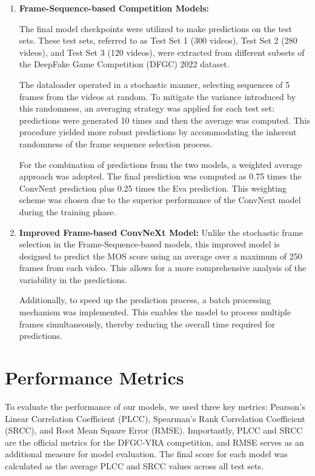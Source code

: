 \documentclass[a4paper,12pt,openright]{book}
\begin{document}
\begin{enumerate}
    \item \textbf{Frame-Sequence-based Competition Models:} 

The final model checkpoints were utilized to make predictions on the test sets. These test sets, referred to as Test Set 1 (300 videos), Test Set 2 (280 videos), and Test Set 3 (120 videos), were extracted from different subsets of the DeepFake Game Competition (DFGC) 2022 dataset.

The dataloader operated in a stochastic manner, selecting sequences of 5 frames from the videos at random. To mitigate the variance introduced by this randomness, an averaging strategy was applied for each test set: predictions were generated 10 times and then the average was computed. This procedure yielded more robust predictions by accommodating the inherent randomness of the frame sequence selection process.

For the combination of predictions from the two models, a weighted average approach was adopted. The final prediction was computed as 0.75 times the ConvNext prediction plus 0.25 times the Eva prediction. This weighting scheme was chosen due to the superior performance of the ConvNext model during the training phase.

\item \textbf{Improved Frame-based ConvNeXt Model:}
Unlike the stochastic frame selection in the Frame-Sequence-based models, this improved model is designed to predict the MOS score using an average over a maximum of 250 frames from each video. This allows for a more comprehensive analysis of the variability in the predictions. 

Additionally, to speed up the prediction process, a batch processing mechanism was implemented. This enables the model to process multiple frames simultaneously, thereby reducing the overall time required for predictions. 
\end{enumerate}

\section{Performance Metrics}
To evaluate the performance of our models, we used three key metrics: Pearson's Linear Correlation Coefficient (PLCC), Spearman's Rank Correlation Coefficient (SRCC), and Root Mean Square Error (RMSE). Importantly, PLCC and SRCC are the official metrics for the DFGC-VRA competition, and RMSE serves as an additional measure for model evaluation.
The final score for each model was calculated as the average PLCC and SRCC values across all test sets.
\end{document}
